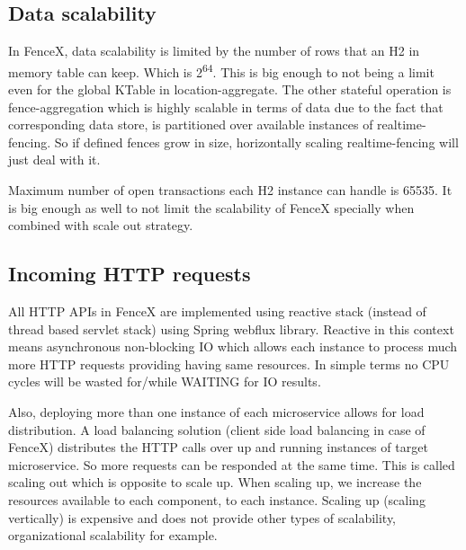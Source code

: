 \documentclass[a4]{report}
\begin{document}
    \subsection{Data scalability}
    In FenceX, data scalability is limited by the number of rows that an H2 in memory table can keep.
    Which is 2\textsuperscript{64}.
    This is big enough to not being a limit even for the global KTable in location-aggregate.
    The other stateful operation is fence-aggregation which is highly scalable in terms of data due to the
    fact that corresponding data store, is partitioned over available instances of realtime-fencing.
    So if defined fences grow in size, horizontally scaling realtime-fencing will just deal with it.

    Maximum number of open transactions each H2 instance can handle is 65535.
    It is big enough as well to not limit the scalability of FenceX specially when combined with scale out strategy.

    \subsection{Incoming HTTP requests}
    All HTTP APIs in FenceX are implemented using reactive stack (instead of thread based servlet stack) using Spring
    webflux library.
    Reactive in this context means asynchronous non-blocking IO which allows each instance to process much more HTTP
    requests providing having same resources.
    In simple terms no CPU cycles will be wasted for/while WAITING for IO results.

    Also, deploying more than one instance of each microservice allows for load distribution.
    A load balancing solution (client side load balancing in case of FenceX) distributes the HTTP calls over up and
    running instances of target microservice.
    So more requests can be responded at the same time.
    This is called scaling out which is opposite to scale up.
    When scaling up, we increase the resources available to each component, to each instance.
    Scaling up (scaling vertically) is expensive and does not provide other types of scalability, organizational
    scalability for example.
\end{document}
